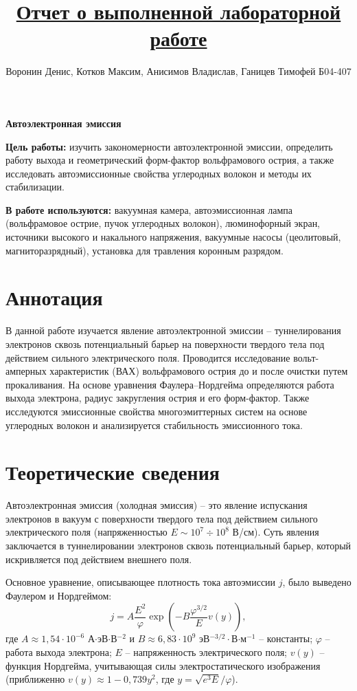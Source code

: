 \documentclass[a4paper]{article}
\title{\underline{Отчет о выполненной лабораторной работе}}
\author{Воронин Денис, Котков Максим, Анисимов Владислав, Ганицев Тимофей Б04-407}
\begin{document}
\maketitle

\begin{center}
    \textbf{\Large Автоэлектронная эмиссия}
\end{center}

\vspace{0.5cm}

\noindent\textbf{Цель работы:} изучить закономерности автоэлектронной эмиссии, определить работу выхода и геометрический форм-фактор вольфрамового острия, а также исследовать автоэмиссионные свойства углеродных волокон и методы их стабилизации.

\vspace{0.2cm}

\noindent\textbf{В работе используются:} вакуумная камера, автоэмиссионная лампа (вольфрамовое острие, пучок углеродных волокон), люминофорный экран, источники высокого и накального напряжения, вакуумные насосы (цеолитовый, магниторазрядный), установка для травления коронным разрядом.

\section{Аннотация}
В данной работе изучается явление автоэлектронной эмиссии -- туннелирования электронов сквозь потенциальный барьер на поверхности твердого тела под действием сильного электрического поля. Проводится исследование вольт-амперных характеристик (ВАХ) вольфрамового острия до и после очистки путем прокаливания. На основе уравнения Фаулера--Нордгейма определяются работа выхода электрона, радиус закругления острия и его форм-фактор. Также исследуются эмиссионные свойства многоэмиттерных систем на основе углеродных волокон и анализируется стабильность эмиссионного тока.

\section{Теоретические сведения}
Автоэлектронная эмиссия (холодная эмиссия) -- это явление испускания электронов в вакуум с поверхности твердого тела под действием сильного электрического поля (напряженностью $E \sim 10^7 \div 10^8$ В/см). Суть явления заключается в туннелировании электронов сквозь потенциальный барьер, который искривляется под действием внешнего поля.

Основное уравнение, описывающее плотность тока автоэмиссии $j$, было выведено Фаулером и Нордгеймом:
\begin{equation}
    j = A \frac{E^2}{\varphi} \exp\left(-B \frac{\varphi^{3/2}}{E} v(y)\right), \tag{1}
\end{equation}
где $A \approx 1{,}54 \cdot 10^{-6}$ А$\cdot$эВ$\cdot$В$^{-2}$ и $B \approx 6{,}83 \cdot 10^9$ эВ$^{-3/2}\cdot$В$\cdot$м$^{-1}$ -- константы; $\varphi$ -- работа выхода электрона; $E$ -- напряженность электрического поля; $v(y)$ -- функция Нордгейма, учитывающая силы электростатического изображения (приближенно $v(y) \approx 1 - 0{,}739 y^2$, где $y = \sqrt{e^3 E}/\varphi$).
\end{document}
